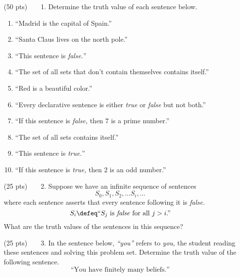 \begin{enumerate}
  \item[(50 pts)~~~~1.]
    Determine the truth value of each sentence below.
    \begin{enumerate}
      \item
        ``Madrid is the capital of Spain.''
      \item
        ``Santa Claus lives on the north pole.''
      \item
        ``This sentence is \emph{false.}''
      \item
        ``The set of all sets that don't contain themselves contains itself.''%
      \item
        ``Red is a beautiful color.''
      \item
        ``Every declarative sentence is either \emph{true} or \emph{false} but not both.''
      \item
        ``If this sentence is \emph{false,} then $7$ is a prime number.''%
      \item
        ``The set of all sets contains itself.''
      \item
        ``This sentence is \emph{true.}''
      \item
        ``If this sentence is \emph{true,} then $2$ is an odd number.''%
    \end{enumerate}

  \item[(25 pts)~~~~2.]
    Suppose we have an infinite sequence of sentences
    \begin{equation*}
      S_0, S_1, S_2, \dots S_i, \dots
    \end{equation*}
    where each sentence asserts that every sentence following it is \emph{false.}
    \begin{equation*}
      S_i \defeq \text{``}S_j \text{ is \emph{false} for all } j > i\text{.''}
    \end{equation*}
    What are the truth values of the sentences in this sequence?

  \item[(25 pts)~~~~3.]
    In the sentence below, \emph{``you''} refers to \emph{you}\emph{,} the student reading these sentences and solving this problem set.
    Determine the truth value of the following sentence.
    \begin{equation*}
      \text{``You have finitely many beliefs.''}
    \end{equation*}
\end{enumerate}


